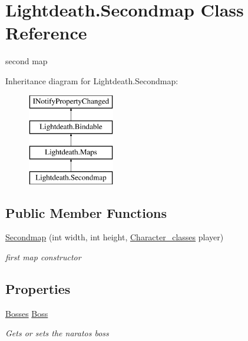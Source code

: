 \hypertarget{class_lightdeath_1_1_secondmap}{}\section{Lightdeath.\+Secondmap Class Reference}
\label{class_lightdeath_1_1_secondmap}


second map  


Inheritance diagram for Lightdeath.\+Secondmap\+:\begin{figure}[H]
\begin{center}
\leavevmode
\includegraphics[height=4.000000cm]{class_lightdeath_1_1_secondmap}
\end{center}
\end{figure}
\subsection*{Public Member Functions}
\begin{DoxyCompactItemize}
\item 
\hyperlink{class_lightdeath_1_1_secondmap_ad45aa8acf5221a0d1255aa4c00a8aadd}{Secondmap} (int width, int height, \hyperlink{class_lightdeath_1_1_character__classes}{Character\+\_\+classes} player)
\begin{DoxyCompactList}\small\item\em first map constructor \end{DoxyCompactList}\end{DoxyCompactItemize}
\subsection*{Properties}
\begin{DoxyCompactItemize}
\item 
\hyperlink{class_lightdeath_1_1_bosses}{Bosses} \hyperlink{class_lightdeath_1_1_secondmap_a1c43b7341db962bac1cecb447123ddf1}{Boss}
\begin{DoxyCompactList}\small\item\em Gets or sets the naratos boss \end{DoxyCompactList}\end{DoxyCompactItemize}
